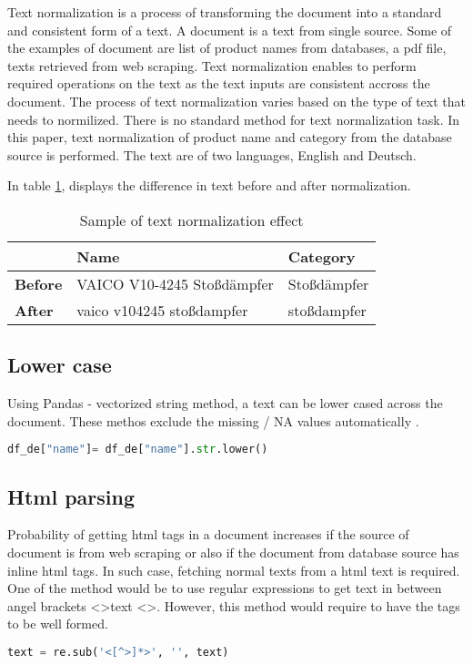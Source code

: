 Text normalization is a process of transforming the document into a standard and consistent form of a text. A document is a text from single source. Some of the examples of document are list of product names from databases, a pdf file, texts retrieved from web scraping. Text normalization enables to perform required operations on the text as the text inputs are consistent accross the document. The process of text normalization varies based on the type of text that needs to normilized. There is no standard method for text normalization task. In this paper, text normalization of product name and category from the database source is performed. The text are of two languages, English and Deutsch.

In table \ref{table:TN}, displays the difference in text before and after normalization. 

\begin{table}[h]
      \caption{Sample of text normalization effect}
      \centering
      \label{table:TN}
\begin{tabular}{lll}
      \toprule 
                  &\textbf{Name} & \textbf{Category} \\ 
      \midrule
      \textbf{Before}&VAICO V10-4245 Stoßdämpfer & Stoßdämpfer \\
      \textbf{After}&vaico v104245 stoßdampfer & stoßdampfer \\
      
      \bottomrule
\end{tabular}
\end{table}

\subsection{Lower case}

Using Pandas - vectorized string method, a text can be lower cased across the document. These methos exclude the missing  / NA values automatically \parencite{mckinney-proc-scipy-2010}.

\begin{lstlisting}[language=Python]
      df_de["name"]= df_de["name"].str.lower()
\end{lstlisting}

\subsection{Html parsing}

Probability of getting html tags in a document increases if the source of document is from web scraping or also if the document from database source has inline html tags. In such case, fetching normal texts from a html text is required. One of the method would be to use regular expressions to get text in between angel brackets \textless \textgreater text \textless \textgreater. However, this method would require to have the tags to be well formed.
\begin{lstlisting}[language=Python]
      text = re.sub('<[^>]*>', '', text)
\end{lstlisting}




